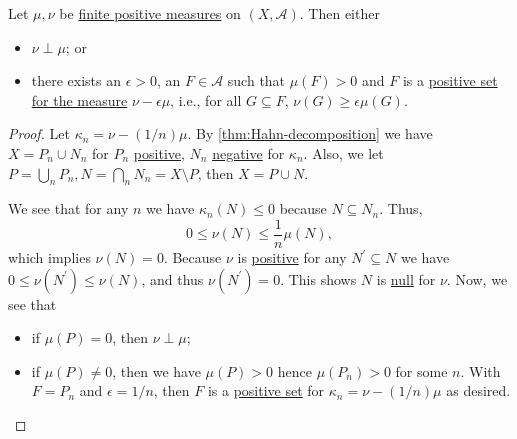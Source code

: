 \begin{lemma}\label{lma:finite-singular}
	Let \(\mu, \nu\) be \hyperref[def:finite-signed-measure]{finite positive measures} on \((X, \mathcal{A})\). Then either
	\begin{itemize}
		\item \(\nu \perp \mu\); or
		\item there exists an \(\epsilon > 0\), an \(F \in \mathcal{A}\) such that \(\mu(F) > 0\) and \(F\) is a \hyperref[def:positive-set]{positive set for the measure} \(\nu - \epsilon \mu\), i.e., for all \(G \subseteq F\), \(\nu(G) \geq \epsilon \mu(G)\).
	\end{itemize}
\end{lemma}
\begin{proof}
	Let \(\kappa_n = \nu - (1/n)\mu\). By \autoref{thm:Hahn-decomposition} we have \(X = P_n \cup N_n\) for \(P_n\) \hyperref[def:positive-set]{positive}, \(N_n\) \hyperref[def:negative-set]{negative} for \(\kappa _n\). Also, we let \(P = \bigcup_n P_n, N = \bigcap_n N_n = X \setminus P\), then \(X = P \cup N\).

	We see that for any \(n\) we have \(\kappa_n(N) \leq 0\) because \(N \subseteq N_n\). Thus,
	\[
		0 \leq \nu(N) \leq \frac{1}{n}\mu(N),
	\]
	which implies \(\nu(N) = 0\). Because \(\nu\) is \hyperref[def:signed-measure]{positive} for any \(N^\prime  \subseteq N\) we have \(0 \leq \nu(N^\prime ) \leq \nu(N)\), and thus \(\nu(N^\prime ) = 0\). This shows \(N\) is \hyperref[def:null-set-signed-measure]{null} for \(\nu \). Now, we see that
	\begin{itemize}
		\item if \(\mu(P) = 0\), then \(\nu \perp \mu\);
		\item if \(\mu(P) \neq 0\), then we have \(\mu (P) > 0\) hence \(\mu(P_n) > 0\) for some \(n\). With \(F = P_n\) and \(\epsilon = 1/n\), then \(F\) is a \hyperref[def:positive-set]{positive set} for \(\kappa_n = \nu - (1/n)\mu\) as desired.
	\end{itemize}
\end{proof}

